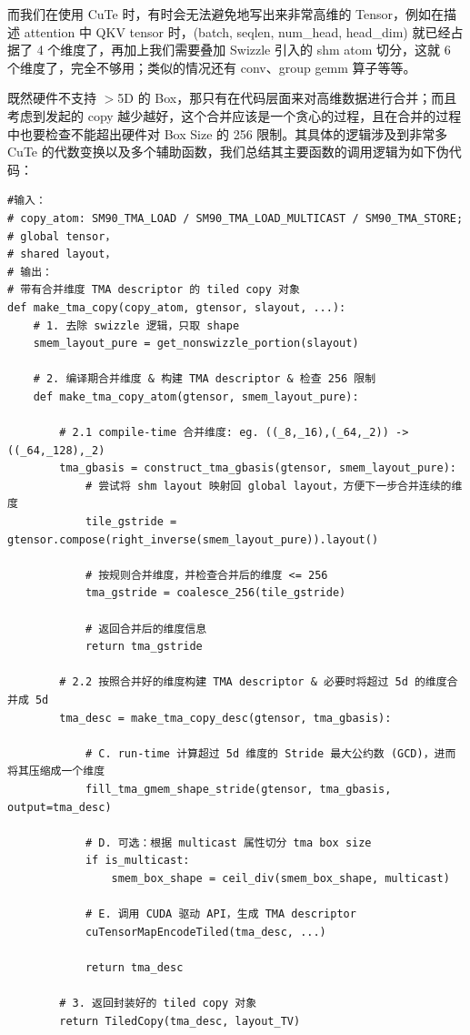 而我们在使用 CuTe 时，有时会无法避免地写出来非常高维的 Tensor，例如在描述 attention 中 QKV tensor 时，(batch, seqlen, num\_head, head\_dim) 就已经占据了 4 个维度了，再加上我们需要叠加 Swizzle 引入的 shm atom 切分，这就 6 个维度了，完全不够用；类似的情况还有 conv、group gemm 算子等等。

既然硬件不支持 $>$5D 的 Box，那只有在代码层面来对高维数据进行合并；而且考虑到发起的 copy 越少越好，这个合并应该是一个贪心的过程，且在合并的过程中也要检查不能超出硬件对 Box Size 的 256 限制。其具体的逻辑涉及到非常多 CuTe 的代数变换以及多个辅助函数，我们总结其主要函数的调用逻辑为如下伪代码：

\begin{lstlisting}
#输入：
# copy_atom: SM90_TMA_LOAD / SM90_TMA_LOAD_MULTICAST / SM90_TMA_STORE;
# global tensor，
# shared layout，
# 输出：
# 带有合并维度 TMA descriptor 的 tiled copy 对象
def make_tma_copy(copy_atom, gtensor, slayout, ...):
    # 1. 去除 swizzle 逻辑，只取 shape
    smem_layout_pure = get_nonswizzle_portion(slayout)

    # 2. 编译期合并维度 & 构建 TMA descriptor & 检查 256 限制
    def make_tma_copy_atom(gtensor, smem_layout_pure):

        # 2.1 compile-time 合并维度: eg. ((_8,_16),(_64,_2)) -> ((_64,_128),_2)
        tma_gbasis = construct_tma_gbasis(gtensor, smem_layout_pure):
            # 尝试将 shm layout 映射回 global layout，方便下一步合并连续的维度
            tile_gstride = gtensor.compose(right_inverse(smem_layout_pure)).layout()

            # 按规则合并维度，并检查合并后的维度 <= 256
            tma_gstride = coalesce_256(tile_gstride)

            # 返回合并后的维度信息
            return tma_gstride

        # 2.2 按照合并好的维度构建 TMA descriptor & 必要时将超过 5d 的维度合并成 5d
        tma_desc = make_tma_copy_desc(gtensor, tma_gbasis):

            # C. run-time 计算超过 5d 维度的 Stride 最大公约数 (GCD)，进而将其压缩成一个维度
            fill_tma_gmem_shape_stride(gtensor, tma_gbasis, output=tma_desc)

            # D. 可选：根据 multicast 属性切分 tma box size
            if is_multicast:
                smem_box_shape = ceil_div(smem_box_shape, multicast)

            # E. 调用 CUDA 驱动 API，生成 TMA descriptor
            cuTensorMapEncodeTiled(tma_desc, ...)

            return tma_desc

        # 3. 返回封装好的 tiled copy 对象
        return TiledCopy(tma_desc, layout_TV)
\end{lstlisting}

